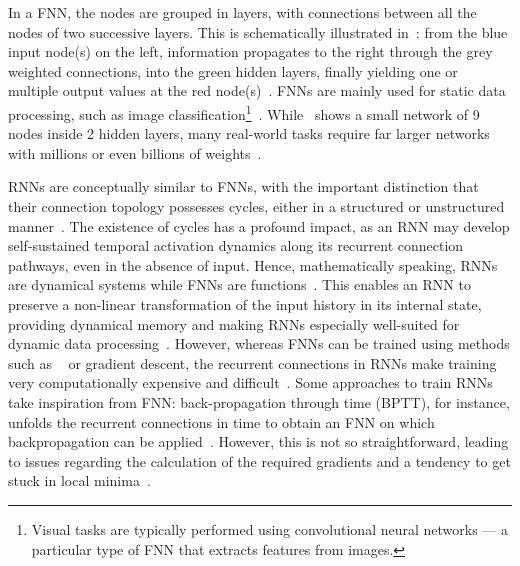 In a FNN, the nodes are grouped in layers, with connections between all the nodes of two successive layers.
This is schematically illustrated in~: from the blue input node(s) on the left, information propagates to the right through the grey weighted connections, into the green hidden layers, finally yielding one or multiple output values at the red node(s)~\cite{zurada1992introduction}.
FNNs are mainly used for static data processing, such as image classification\footnote{Visual tasks are typically performed using convolutional neural networks --- a particular type of FNN that extracts features from images.}~\cite{ApproximationRNN}.
While~ shows a small network of 9 nodes inside 2 hidden layers, many real-world tasks require far larger networks with millions or even billions of weights~\cite{ImageNet,BLOOM_CarbonFootprint_176Bparam,GPT-J-6B}. \par
RNNs are conceptually similar to FNNs, with the important distinction that their connection topology possesses cycles, either in a structured or unstructured manner~\cite{lukovsevivcius2009reservoir,Hopfield1982}.
The existence of cycles has a profound impact, as an RNN may develop self-sustained temporal activation dynamics along its recurrent connection pathways, even in the absence of input.
Hence, mathematically speaking, RNNs are dynamical systems while FNNs are functions~\cite{lukovsevivcius2009reservoir}. %
This enables an RNN to preserve a non-linear transformation of the input history in its internal state, providing dynamical memory and making RNNs especially well-suited for dynamic data processing~\cite{RC_RecentAdvances,ApproximationRNN}.
However, whereas FNNs can be trained using methods such as ~\cite{Backpropagation} or gradient descent, the recurrent connections in RNNs make training very computationally expensive and difficult~\cite{DifficultyTrainingRNN,EvaluatingRestrictedESNs,Moon_2021,RC_SuperconductingElectronics,funahashi1992neural}.
Some approaches to train RNNs take inspiration from FNN: back-propagation through time (BPTT), for instance, unfolds the recurrent connections in time to obtain an FNN on which backpropagation can be applied~\cite{jaeger2002tutorial}.
However, this is not so straightforward, leading to issues regarding the calculation of the required gradients and a tendency to get stuck in local minima~\cite{RC_Tensegrity,DifficultyTrainingRNN,D-ESN-Improved}. %

